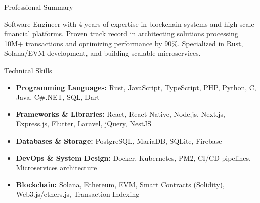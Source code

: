 \documentclass[]{mcdowellcv}
\begin{document}
	\makeheader
	
	\begin{cvsection}{Professional Summary}
		\begin{cvsubsection}{}{}{}
      Software Engineer with 4 years of expertise in blockchain systems and high-scale financial platforms. Proven track record in architecting solutions processing 10M+ transactions and optimizing performance by 90\%. Specialized in Rust, Solana/EVM development, and building scalable microservices.
    \end{cvsubsection}
	\end{cvsection}

	\begin{cvsection}{Technical Skills}
		\begin{cvsubsection}{}{}{}	
			\begin{itemize}
        \item \textbf{Programming Languages:} Rust, JavaScript, TypeScript, PHP, Python, C, Java, C\#.NET, SQL, Dart
				\item \textbf{Frameworks \& Libraries:} React, React Native, Node.js, Next.js, Express.js, Flutter, Laravel, jQuery, NestJS
				\item \textbf{Databases \& Storage:} PostgreSQL, MariaDB, SQLite, Firebase
				\item \textbf{DevOps \& System Design:} Docker, Kubernetes, PM2, CI/CD pipelines, Microservices architecture
        \item \textbf{Blockchain:} Solana, Ethereum, EVM, Smart Contracts (Solidity), Web3.js/ethers.js, Transaction Indexing
      \end{itemize}
		\end{cvsubsection}
	\end{cvsection}
	
\end{document}
